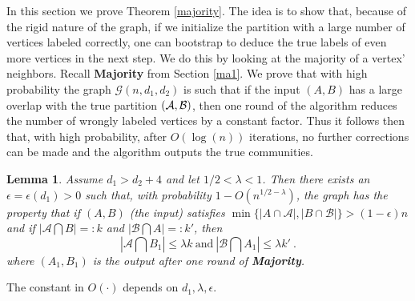 \documentclass[11pt,reqno]{amsart}
\newtheorem{lemma}{Lemma}
\begin{document}
In this section we prove Theorem \ref{majority}. The idea is to show
that, because of the rigid nature of the graph, if we initialize the
partition with a large number of vertices labeled correctly, one can
bootstrap to deduce the true labels of even more vertices in the next
step. We do this by looking at the majority of a vertex'
neighbors. Recall \textbf{Majority}  from Section \ref{ma1}. We prove
that with high probability the graph $\mathcal{G}(n,d_1,d_2)$ is such
that if the input $(A,B)$ has a large overlap with the true partition
$(\mathcal{A},\mathcal{B})$, then one round of the algorithm reduces the number of
wrongly labeled vertices by a  constant factor. Thus it follows then
that, with high probability, after $O(\log(n))$ iterations, no further corrections can be made
and the algorithm outputs the true communities. 


\begin{lemma}\label{maj_lem}  
Assume $d_1>d_2+4$ and let
$1/2<\lambda<1$. Then there exists an $\epsilon=\epsilon(d_1)>0$ such that, with probability
$1-O(n^{1/2-\lambda})$, the graph has the property that if  $(A,B)$ (the input)  satisfies $\min\{|A\cap \mathcal{A}|,|B\cap
\mathcal{B}|\}>(1-\epsilon)n$ and if $|\mathcal{A}\bigcap B|=:k$ and $|\mathcal{B} \bigcap A|=:k'$, then 
\[
|\mathcal{A}\bigcap B_1|\leq \lambda  k~\mbox{and}~
|\mathcal{B}\bigcap A_1|\leq \lambda k'~.
\] 
where $(A_1,B_1)$ is the output after one round of \textbf{Majority}.
\end{lemma}
The constant in $O(\cdot)$ depends on $d_1,\lambda, \epsilon.$
\end{document}
